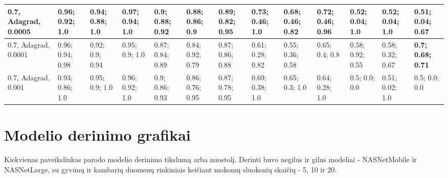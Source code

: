 \documentclass{VUMIFPSbakalaurinis}
\begin{document}
\begin{longtable}{ | p{1.5cm} | p{1cm} | p{1cm} | p{1cm} | p{1cm} | p{1cm} | p{1cm} | p{1cm} | p{1cm} | p{1cm} | p{1cm} | p{1cm} | p{1cm} | }
    0.7, Adagrad, 0.0005  & 0.96; 0.92; 1.0 & 0.94; 0.88; 1.0 & 0.97; 0.94; 1.0   &  \textbf{0.9; 0.88; 0.92} & 0.88; 0.86; 0.9 & 0.89; 0.82; 0.95    &  0.73; 0.46; 1.0 & 0.68; 0.46; 0.82 & \textbf{0.72; 0.46; 0.96}  & 0.52; 0.04; 1.0 & 0.52; 0.04; 1.0 & 0.51; 0.04; 0.67  \\ \hline
    0.7, Adagrad, 0.0001  & 0.96; 0.94; 0.98 & 0.92; 0.9; 0.94 & 0.95; 0.9; 1.0   &  0.87; 0.84; 0.89 & 0.84; 0.92; 0.79 & 0.87; 0.86; 0.88  &  0.61; 0.28; 0.82 & 0.55; 0.36; 0.58 & 0.65; 0.4; 0.8            &  0.58; 0.92; 0.55 & 0.58; 0.32; 0.67 &  \textbf{0.7; 0.68; 0.71}  \\ \hline
    0.7, Adagrad, 0.001   & 0.93; 0.86; 1.0 & 0.95; 0.9; 1.0 & 0.96; 0.92; 1.0    &  0.9; 0.86; 0.93 & 0.86; 0.76; 0.95 & 0.87; 0.78; 0.95   &  0.69; 0.38; 1.0 & 0.65; 0.3; 1.0 & 0.64; 0.28; 1.0              &  0.5; 0.0; 0.0 & 0.51; 0.02; 1.0 & 0.5; 0.0; 0.0  \\ \hline
\end{longtable}

\section{Modelio derinimo grafikai}
Kiekvienas paveiksliukas parodo modelio derinimo tikslumą arba nuostolį. Derinti buvo negilus ir gilus modeliai - NASNetMobile ir NASNetLarge, su gyvūnų ir kambarių duomenų rinkiniais keičiant mokomų sluoksnių skaičių - 5, 10 ir 20.
\end{document}
